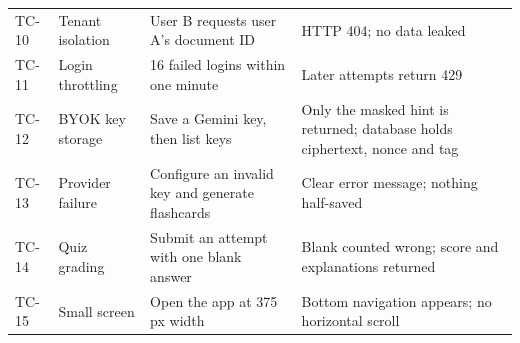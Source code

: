 {\begin{longtable}{@{}p{}p{}p{}p{}@{}}
TC-10 & Tenant isolation & User B requests user A's document ID & HTTP 404; no data leaked\\
TC-11 & Login throttling & 16 failed logins within one minute & Later attempts return 429\\
TC-12 & BYOK key storage & Save a Gemini key, then list keys & Only the masked hint is returned; database holds ciphertext, nonce and tag\\
TC-13 & Provider failure & Configure an invalid key and generate flashcards & Clear error message; nothing half-saved\\
TC-14 & Quiz grading & Submit an attempt with one blank answer & Blank counted wrong; score and explanations returned\\
TC-15 & Small screen & Open the app at 375\,px width & Bottom navigation appears; no horizontal scroll\\
\end{longtable}
}
